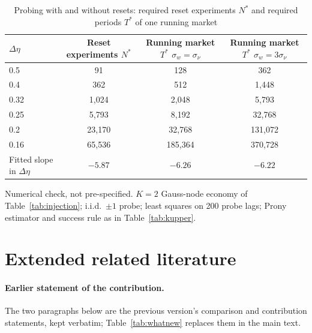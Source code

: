 \documentclass[12pt]{article}
\theoremstyle{definition}
\theoremstyle{remark}
\begin{document}
\begin{table}[!htbp]\centering\small
\begin{threeparttable}
\caption{Probing with and without resets: required reset experiments $N^*$ and required periods $T^*$ of one running market}\label{tab:running}
\begin{tabular}{lccc}
\toprule
$\Delta\eta$ & Reset experiments $N^*$ & \shortstack{Running market $T^*$\\ $\sigma_w=\sigma_\nu$} & \shortstack{Running market $T^*$\\ $\sigma_w=3\sigma_\nu$}\\
\midrule
0.5 & 91 & 128 & 362\\
0.4 & 362 & 512 & 1{,}448\\
0.32 & 1{,}024 & 2{,}048 & 5{,}793\\
0.25 & 5{,}793 & 8{,}192 & 32{,}768\\
0.2 & 23{,}170 & 32{,}768 & 131{,}072\\
0.16 & 65{,}536 & 185{,}364 & 370{,}728\\
\midrule
Fitted slope in $\Delta\eta$ & $-5.87$ & $-6.26$ & $-6.22$\\
\bottomrule
\end{tabular}
\begin{tablenotes}\footnotesize\item Numerical check, not pre-specified. $K=2$ Gauss-node economy of Table~\ref{tab:injection}; i.i.d.\ $\pm1$ probe; least squares on 200 probe lags; Prony estimator and success rule as in Table~\ref{tab:kupper}.\end{tablenotes}
\end{threeparttable}
\end{table}

\section{Extended related literature}\label{sec:lit}
\paragraph{Earlier statement of the contribution.} The two paragraphs below are the previous version's comparison and contribution statements, kept verbatim; Table~\ref{tab:whatnew} replaces them in the main text.
\end{document}

